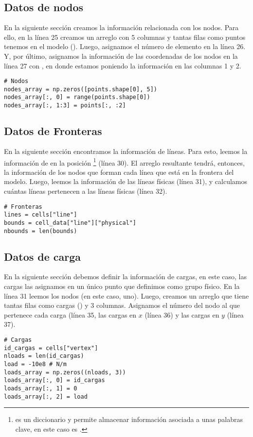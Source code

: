 \subsection{Datos de nodos}
En la siguiente sección creamos la información relacionada con los nodos. Para ello, en la línea 25 creamos un arreglo  con 5 columnas y tantas filas como puntos tenemos en el modelo (). Luego, asignamos el número de elemento en la línea 26. Y, por último, asignamos la información de las coordenadas de los nodos en la línea 27 con , en donde estamos poniendo la información en las columnas 1 y 2.
\begin{verbatim}
# Nodos
nodes_array = np.zeros([points.shape[0], 5])
nodes_array[:, 0] = range(points.shape[0])
nodes_array[:, 1:3] = points[:, :2]
\end{verbatim}

\subsection{Datos de Fronteras}
En la siguiente sección encontramos la información de líneas. Para esto, leemos la información de  en la posición \footnote{ es un diccionario y permite almacenar información asociada a unas palabras clave, en este caso es .} (línea 30). El arreglo resultante  tendrá, entonces, la información de los nodos que forman cada línea que está en la frontera del modelo. Luego, leemos la información de las líneas físicas (línea 31), y calculamos cuántas líneas pertenecen a las líneas físicas (línea 32).
\begin{verbatim}
# Fronteras
lines = cells["line"]
bounds = cell_data["line"]["physical"]
nbounds = len(bounds)
\end{verbatim}

\subsection{Datos de carga}
En la siguiente sección debemos definir la información de cargas, en este caso, las cargas las asignamos en un único punto que definimos como grupo físico. En la línea 31 leemos los nodos (en este caso, uno). Luego, creamos un arreglo que tiene tantas filas como cargas () y 3 columnas. Asignamos el número del nodo al que pertenece cada carga (línea 35, las cargas en $x$ (línea 36) y las cargas en $y$ (línea 37).
\begin{verbatim}
# Cargas
id_cargas = cells["vertex"]
nloads = len(id_cargas)
load = -10e8 # N/m
loads_array = np.zeros((nloads, 3))
loads_array[:, 0] = id_cargas
loads_array[:, 1] = 0
loads_array[:, 2] = load
\end{verbatim}

